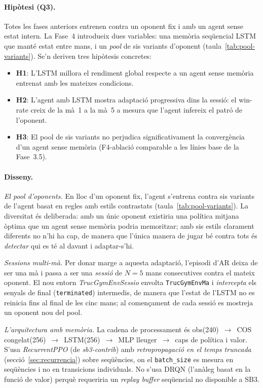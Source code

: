 \paragraph{Hipòtesi (Q3).} Totes les fases anteriors entrenen contra un oponent fix i amb
un agent sense estat intern. La Fase~4 introdueix dues variables: una memòria seqüencial \acf{LSTM}
que manté estat entre mans, i un \emph{pool} de sis variants d'oponent
(taula~\ref{tab:pool-variants}). Se'n deriven tres hipòtesis concretes:
\begin{itemize}
  \item \textbf{H1}: L'\ac{LSTM} millora el rendiment global respecte a un agent sense
        memòria entrenat amb les mateixes condicions.
  \item \textbf{H2}: L'agent amb \ac{LSTM} mostra adaptació progressiva dins la sessió:
        el win-rate creix de la mà~1 a la mà~5 a mesura que l'agent infereix el patró de
        l'oponent.
  \item \textbf{H3}: El pool de sis variants no perjudica significativament la convergència
        d'un agent sense memòria (F4-ablació comparable a les línies base de la Fase~3.5).
\end{itemize}

\paragraph{Disseny.}

\emph{El pool d'oponents.} En lloc d'un oponent fix, l'agent s'entrena contra sis variants
de l'agent basat en regles amb estils contrastats (taula~\ref{tab:pool-variants}). La diversitat
és deliberada: amb un únic oponent existiria una política mitjana òptima que un agent sense
memòria podria memoritzar; amb sis estils clarament diferents no n'hi ha cap, de manera que
l'única manera de jugar bé contra tots és \emph{detectar} qui es té al davant i adaptar-s'hi.

\emph{Sessions multi-mà.} Per donar marge a aquesta adaptació, l'episodi d'\ac{AR} deixa de
ser una mà i passa a ser una \emph{sessió} de \(N=5\) mans consecutives contra el mateix
oponent. El nou entorn \emph{TrucGymEnvSessio} envolta \texttt{TrucGymEnvMa} i
\emph{intercepta} els senyals de final (\texttt{terminated}) intermedis, de manera que
l'estat de l'\ac{LSTM} no es reinicia fins al final de les cinc mans; al començament de cada
sessió es mostreja un oponent nou del pool.

\emph{L'arquitectura amb memòria.} La cadena de processament és
obs(240)~$\rightarrow$~COS congelat(256)~$\rightarrow$~\ac{LSTM}(256)~$\rightarrow$~\ac{MLP}
lleuger~$\rightarrow$~caps de política i valor. S'usa \emph{RecurrentPPO} (de
\emph{sb3-contrib}) amb \emph{retropropagació en el temps truncada}
(secció~\ref{sec:recurrencia}) sobre seqüències, on el \texttt{batch\_size} es mesura en seqüències
i no en transicions individuals. No s'usa \acs{DRQN} (l'anàleg basat en la funció de valor)
perquè requeriria un \emph{replay buffer} seqüencial no disponible a \ac{SB3}.

